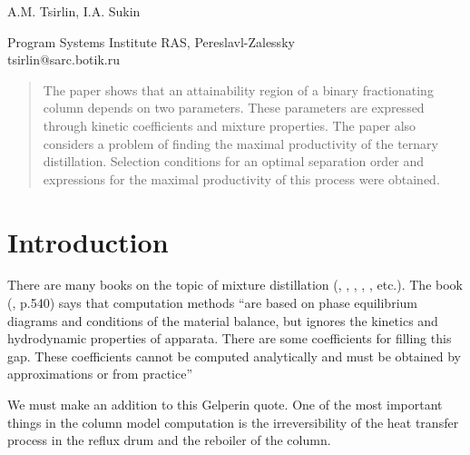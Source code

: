 \documentclass[12pt]{article}
\begin{document}
\begin{center}
\end{center}

\begin{center}
\hspace{0.5cm} \large{A.M. Tsirlin, I.A. Sukin}
\end{center}

\begin{center}
Program Systems Institute RAS, Pereslavl-Zalessky\\
tsirlin@sarc.botik.ru
\end{center}

\begin{abstract} 
The paper shows that an attainability region of a binary fractionating column depends on two parameters. These parameters are expressed through kinetic coefficients and mixture properties. The paper also considers a problem of finding the maximal productivity of the ternary distillation. Selection conditions for an optimal separation order and expressions for the maximal productivity of this process were obtained. 
\end{abstract}


\section{Introduction}
  There are many books on the topic of mixture distillation (\cite{PlnvskNklv}, \cite{Gelp}, \cite{Aleksandr1}, \cite{Kafar}, \cite{PetlSer}, etc.). The book (\cite{Gelp}, p.540) says that computation methods ``are based on phase equilibrium diagrams and conditions of the material balance, but ignores the kinetics and hydrodynamic properties of apparata. There are some coefficients for filling this gap. These coefficients cannot be computed analytically and must be obtained by approximations or from practice''

We must make an addition to this Gelperin quote. One of the most important things in the column model computation is the irreversibility of the heat transfer process in the reflux drum and the reboiler of the column.
  
\end{document}
